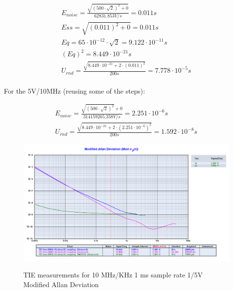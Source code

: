 \documentclass[11pt,english,a4paper]{article}
\begin{document}
\begingroup
\addtolength{\jot}{1em}
\begin{align}
E_{noise} = \frac{\sqrt{(500\cdot\sqrt{2})^2 + 0}}{62831.853V/s} = 0.011s\\
Ess = \sqrt{ (0.011)^2 + 0 } = 0.011s \\
Eq = 65\cdot10^{-12}\cdot\sqrt{2} = 9.122\cdot10^{-11}s \\
(Eq)^2 = 8.449\cdot10^{-21}s \\
U_{rnd} = \frac{\sqrt{8.449\cdot10^{-21} + 2\cdot(0.011)^2}}{200s} = 7.778\cdot10^{-5}s \\
\end{align}
\endgroup

For the 5V/10MHz (reusing some of the steps):

\begingroup
\addtolength{\jot}{1em}
\begin{align}
E_{noise} = \frac{\sqrt{(500\cdot\sqrt{2})^2} + 0}{314159265.358V/s} = 2.251\cdot10^{-6}s\\
U_{rnd} = \frac{\sqrt{8.449\cdot10^{-21} + 2\cdot(2.251\cdot10^{-6})^2}}{200s} = 1.592\cdot10^{-8}s
\end{align}
\endgroup


\begin{figure}[!htb]
  \centering
    \includegraphics[width=1\textwidth]{mod_allan_last_part3.png}
    \label{fig:15Vsg_10x_mod_allan_dev}
      \caption{TIE measurements for 10 MHz/KHz 1 ms sample rate 1/5V Modified Allan Deviation}
\end{figure}
\end{document}
